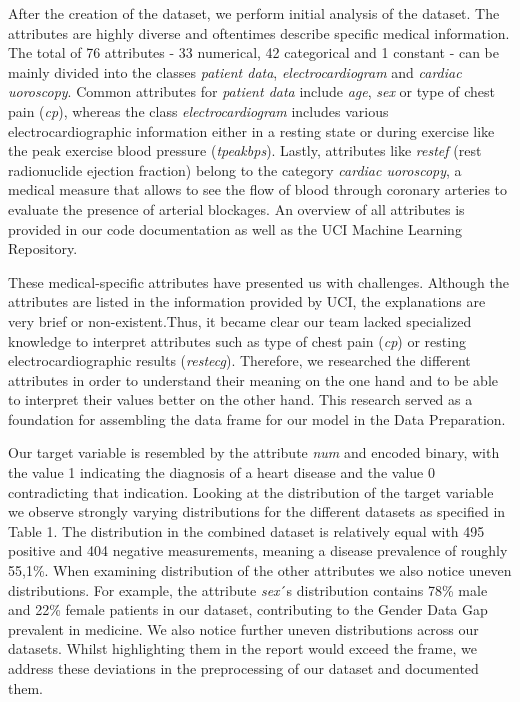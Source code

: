 After the creation of the dataset, we perform initial analysis of the dataset. The attributes are highly diverse and oftentimes describe specific medical information. The total of 76 attributes - 33 numerical, 42 categorical and 1 constant - can be mainly divided into the classes \textit{patient data}, \textit{electrocardiogram} and \textit{cardiac uoroscopy}. Common attributes for \textit{patient data} include \textit{age}, \textit{sex} or type of chest pain (\textit{cp}), whereas the class \textit{electrocardiogram} includes various electrocardiographic information either in a resting state or during exercise like the peak exercise blood pressure (\textit{tpeakbps}). Lastly, attributes like \textit{restef} (rest radionuclide ejection fraction) belong to the category \textit{cardiac uoroscopy}, a medical measure that allows to see the flow of blood through coronary arteries to evaluate the presence of arterial blockages. An overview of all attributes is provided in our code documentation as well as the UCI Machine Learning Repository. 



These medical-specific attributes have presented us with challenges. Although the attributes are listed in the information provided by UCI, the explanations are very brief or non-existent.Thus, it became clear our team lacked specialized knowledge to interpret attributes such as type of chest pain (\textit{cp}) or resting electrocardiographic results (\textit{restecg}). Therefore, we researched the different attributes in order to understand their meaning on the one hand and to be able to interpret their values better on the other hand. This research served as a foundation for assembling the data frame for our model in the Data Preparation. 

Our target variable is resembled by the attribute \textit{num} and encoded binary, with the value 1 indicating the diagnosis of a heart disease and the value 0 contradicting that indication. Looking at the distribution of the target variable we observe strongly varying distributions for the different datasets as specified in Table 1. The distribution in the combined dataset is relatively equal with 495 positive and 404 negative measurements, meaning a disease prevalence of roughly 55,1\%. When examining distribution of the other attributes we also notice uneven distributions. For example, the attribute \textit{sex}´s distribution contains 78\% male and 22\% female patients in our dataset, contributing to the Gender Data Gap prevalent in medicine. We also notice further uneven distributions across our datasets. Whilst highlighting them in the report would exceed the frame, we address these deviations in the preprocessing of our dataset and documented them.  

